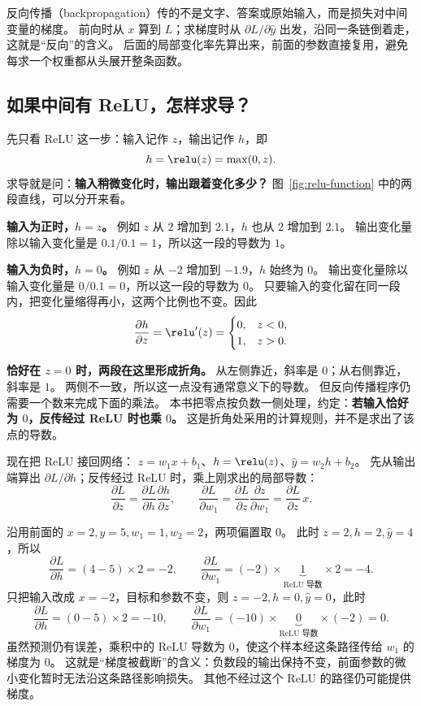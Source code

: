 

\begin{idea}
反向传播（backpropagation）传的不是文字、答案或原始输入，而是损失对中间变量的梯度。
前向时从 $x$ 算到 $L$；求梯度时从 $\partial L/\partial\widehat{y}$ 出发，沿同一条链倒着走，这就是“反向”的含义。
后面的局部变化率先算出来，前面的参数直接复用，避免每求一个权重都从头展开整条函数。
\end{idea}\label{route:backprop-end}

\subsection{如果中间有 ReLU，怎样求导？}

先只看 ReLU 这一步：输入记作 $z$，输出记作 $h$，即
\[
h=\relu(z)=\max(0,z).
\]
求导就是问：\textbf{输入稍微变化时，输出跟着变化多少？}
图~\ref{fig:relu-function} 中的两段直线，可以分开来看。

\textbf{输入为正时，$h=z$。}
例如 $z$ 从 $2$ 增加到 $2.1$，$h$ 也从 $2$ 增加到 $2.1$。
输出变化量除以输入变化量是 $0.1/0.1=1$，所以这一段的导数为 $1$。

\textbf{输入为负时，$h=0$。}
例如 $z$ 从 $-2$ 增加到 $-1.9$，$h$ 始终为 $0$。
输出变化量除以输入变化量是 $0/0.1=0$，所以这一段的导数为 $0$。
只要输入的变化留在同一段内，把变化量缩得再小，这两个比例也不变。因此
\[
\frac{\partial h}{\partial z}=\relu'(z)=
\begin{cases}
0,&z<0,\\
1,&z>0.
\end{cases}
\]

\textbf{恰好在 $z=0$ 时，两段在这里形成折角。}
从左侧靠近，斜率是 $0$；从右侧靠近，斜率是 $1$。
两侧不一致，所以这一点没有通常意义下的导数。
但反向传播程序仍需要一个数来完成下面的乘法。
本书把零点按负数一侧处理，约定：\textbf{若输入恰好为 $0$，反传经过 ReLU 时也乘 $0$。}
这是折角处采用的计算规则，并不是求出了该点的导数。

现在把 ReLU 接回网络：
$z=w_1x+b_1$、$h=\relu(z)$、$\widehat{y}=w_2h+b_2$。
先从输出端算出 $\partial L/\partial h$；反传经过 ReLU 时，乘上刚求出的局部导数：
\[
\frac{\partial L}{\partial z}
=\frac{\partial L}{\partial h}\frac{\partial h}{\partial z},\qquad
\frac{\partial L}{\partial w_1}
=\frac{\partial L}{\partial z}\frac{\partial z}{\partial w_1}
=\frac{\partial L}{\partial z}\,x.
\]

沿用前面的 $x=2,y=5,w_1=1,w_2=2$，两项偏置取 $0$。
此时 $z=2,h=2,\widehat{y}=4$，所以
\[
\frac{\partial L}{\partial h}=(4-5)\times2=-2,\qquad
\frac{\partial L}{\partial w_1}=(-2)\times\underbrace{1}_{\text{ReLU 导数}}\times2=-4.
\]
只把输入改成 $x=-2$，目标和参数不变，则 $z=-2,h=0,\widehat{y}=0$，此时
\[
\frac{\partial L}{\partial h}=(0-5)\times2=-10,\qquad
\frac{\partial L}{\partial w_1}=(-10)\times\underbrace{0}_{\text{ReLU 导数}}\times(-2)=0.
\]
虽然预测仍有误差，乘积中的 ReLU 导数为 $0$，使这个样本经这条路径传给 $w_1$ 的梯度为 $0$。
这就是“梯度被截断”的含义：负数段的输出保持不变，前面参数的微小变化暂时无法沿这条路径影响损失。
其他不经过这个 ReLU 的路径仍可能提供梯度。

